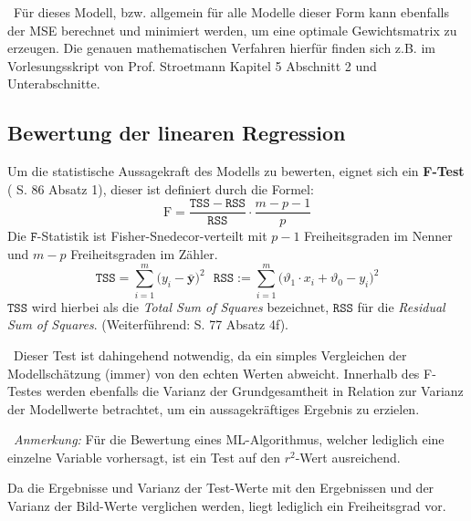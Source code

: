 ~\newline Für dieses Modell, bzw. allgemein für alle Modelle dieser Form kann ebenfalls der MSE berechnet und minimiert werden, um eine optimale Gewichtsmatrix zu erzeugen. Die genauen mathematischen Verfahren hierfür finden sich z.B. im Vorlesungsskript von Prof. Stroetmann \cite{stroetmann} Kapitel 5 Abschnitt 2 und Unterabschnitte.
\subsection{Bewertung der linearen Regression}
\label{subsec:LinRegAcc}
Um die statistische Aussagekraft des Modells zu bewerten, eignet sich ein \textbf{F-Test} (\cite{stroetmann} S. 86 Absatz 1), dieser ist definiert durch die Formel:
\begin{equation}
\label{eq:F-statistic}
\mathrm{F} = \frac{\mathtt{TSS} - \mathtt{RSS}}{\mathtt{RSS}} \cdot \frac{m - p - 1}{p}
\end{equation}
Die $\mathtt{F}$-Statistik ist Fisher-Snedecor-verteilt mit $p-1$ Freiheitsgraden im Nenner und $m-p$ Freiheitsgraden im Zähler. 
\begin{equation}
\mathtt{TSS} = \sum\limits_{i=1}^m \bigl(y_i - \bar{\mathbf{y}}\bigr)^2 \ \ \
\mathtt{RSS} := \sum\limits_{i=1}^m \bigl(\vartheta_1 \cdot x_i + \vartheta_0 - y_i\bigr)^2
\end{equation}
$\mathtt{TSS}$ wird hierbei als die \textit{Total Sum of Squares} bezeichnet, $\mathtt{RSS}$ für die \textit{Residual Sum of Squares}. (Weiterführend: \cite{stroetmann} S. 77 Absatz 4f). 

~\newline Dieser Test ist dahingehend notwendig, da ein simples Vergleichen der Modellschätzung (immer) von den echten Werten abweicht. Innerhalb des F-Testes werden ebenfalls die Varianz der Grundgesamtheit in Relation zur Varianz der Modellwerte betrachtet, um ein aussagekräftiges Ergebnis zu erzielen.


~\newline \textit{Anmerkung:} Für die Bewertung eines ML-Algorithmus, welcher lediglich eine einzelne Variable vorhersagt, ist ein Test auf den $r^2$-Wert ausreichend. 

Da die Ergebnisse und  Varianz der Test-Werte mit den Ergebnissen und der  Varianz der Bild-Werte verglichen werden, liegt lediglich ein Freiheitsgrad vor.  